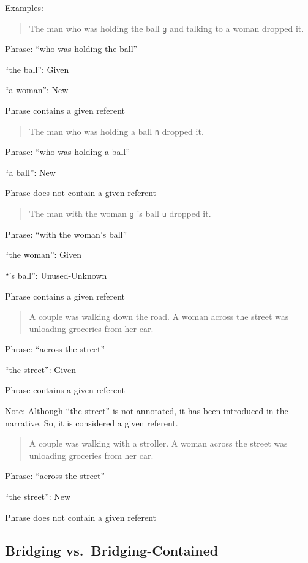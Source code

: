 \documentclass[
]{book}
\begin{document}
Examples:

\begin{quote}
The man who was holding the ball \texttt{g} and talking to a woman dropped it.
\end{quote}

Phrase: ``who was holding the ball''

``the ball'': Given

``a woman'': New

Phrase contains a given referent

\begin{quote}
The man who was holding a ball \texttt{n} dropped it.
\end{quote}

Phrase: ``who was holding a ball''

``a ball'': New

Phrase does not contain a given referent

\begin{quote}
The man with the woman \texttt{g} 's ball \texttt{u} dropped it.
\end{quote}

Phrase: ``with the woman's ball''

``the woman'': Given

``'s ball'': Unused-Unknown

Phrase contains a given referent

\begin{quote}
A couple was walking down the road.
A woman across the street was unloading groceries from her car.
\end{quote}

Phrase: ``across the street''

``the street'': Given

Phrase contains a given referent

Note: Although ``the street'' is not annotated, it has been introduced in the narrative.
So, it is considered a given referent.

\begin{quote}
A couple was walking with a stroller.
A woman across the street was unloading groceries from her car.
\end{quote}

Phrase: ``across the street''

``the street'': New

Phrase does not contain a given referent

\hypertarget{bridging-vs.-bridging-contained}{%
\subsection{Bridging vs.~Bridging-Contained}\label{bridging-vs.-bridging-contained}}
\end{document}
